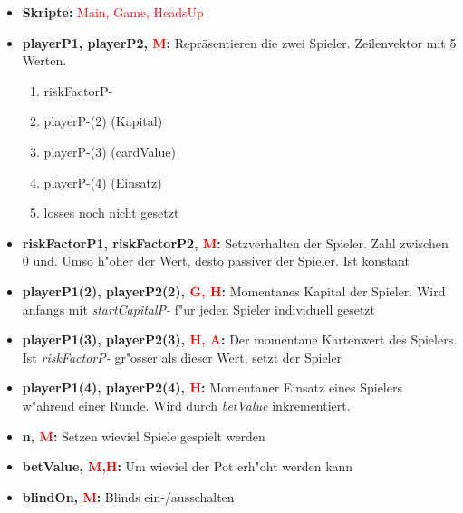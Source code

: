 \documentclass[11pt]{article}
\begin{document}
\begin{itemize}

\item	\textbf{Skripte:} \textcolor{red}{Main, Game, HeadsUp} \\

\item	\textbf{playerP1, playerP2, \textcolor{red}{M}:} Repräsentieren die zwei Spieler. Zeilenvektor mit 5 Werten. 
\begin{enumerate}
	\item riskFactorP-
	\item playerP-(2) (Kapital)
	\item playerP-(3) (cardValue)
	\item playerP-(4) (Einsatz)
	\item losses noch nicht gesetzt
\end{enumerate}		
	
\item	\textbf{riskFactorP1, riskFactorP2, \textcolor{red}{M}:}  Setzverhalten der Spieler. Zahl zwischen 0 und. Umso h"oher der Wert, desto passiver der Spieler. Ist konstant\\

\item	\textbf{playerP1(2), playerP2(2), \textcolor{red}{G, H}:} Momentanes Kapital der Spieler. Wird anfangs mit \emph{startCapitalP-} f"ur jeden Spieler individuell gesetzt\\

\item	\textbf{playerP1(3), playerP2(3), \textcolor{red}{H, A}:} Der momentane Kartenwert des Spielers. Ist \emph{riskFactorP-} gr"osser als dieser Wert, setzt der Spieler\\

\item	\textbf{playerP1(4), playerP2(4), \textcolor{red}{H}:} Momentaner Einsatz eines Spielers w"ahrend einer Runde. Wird durch \emph{betValue} inkrementiert.\\
\item	\textbf{n, \textcolor{red}{M}:} Setzen wieviel Spiele gespielt werden\\

\item	\textbf{betValue, \textcolor{red}{M,H}:} Um wieviel der Pot erh"oht werden kann\\

\item	\textbf{blindOn, \textcolor{red}{M}:} Blinds ein-/ausschalten\\


\end{itemize}
\end{document}
